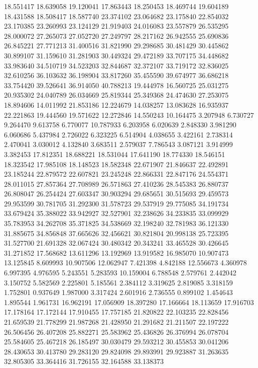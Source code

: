 18.551417
18.639058
19.120041
17.863443
18.250453
18.469744
19.604189
18.431588
18.508417
18.587740
23.374102
23.064682
23.175840
22.854032
23.170385
23.260993
23.124129
21.919403
24.016083
23.557879
26.535295
28.000072
27.265073
27.052720
27.249797
28.217162
26.942555
25.690836
26.845221
27.771213
31.400516
31.821990
29.298685
30.481429
30.445862
30.899107
31.159610
31.281903
30.449324
29.472189
33.707175
34.448682
33.983640
34.510719
34.523203
32.844687
32.372107
33.719172
32.836025
32.610256
36.103632
36.198904
33.817260
35.455590
39.674977
36.686218
33.754420
39.526641
36.914050
40.788213
19.444978
16.560725
25.031275
20.935302
24.040789
26.034669
25.819344
25.349368
24.474630
27.253075
18.894606
14.011992
21.853186
12.224679
14.038257
13.083628
16.935937
22.221863
19.444560
19.571622
12.272846
14.550243
10.164475
3.207948
6.730727
9.264470
9.613758
6.770077
10.787933
6.203958
6.020639
2.848330
3.981290
6.060686
5.437984
2.726022
6.323225
6.514904
4.038655
3.422161
2.738314
2.470041
3.030012
4.132840
3.683511
2.579037
7.786543
3.087121
3.914999
3.382453
17.812351
18.688221
18.531044
17.641190
18.774330
18.546151
18.323542
17.985108
18.148523
18.582348
22.671907
21.846637
22.492891
23.185244
22.879572
22.607821
23.245248
22.866331
22.847176
24.554371
28.011015
27.857364
27.708989
26.571863
27.410236
28.545383
26.880737
26.808047
26.254424
27.603347
30.903294
29.685651
30.515693
29.459573
29.953599
30.781705
31.292300
31.578723
29.537919
29.775085
34.191734
33.679424
35.388022
33.942927
32.527901
32.238626
34.233835
33.099929
35.783953
34.262708
35.371825
34.538669
32.198240
32.781983
36.121330
31.885675
34.856848
37.665626
32.456621
30.821804
20.998138
25.723395
31.527700
21.691328
32.067424
30.480342
20.343241
33.465528
30.426645
31.271852
17.568682
13.611296
13.192969
13.919582
16.985070
10.907473
13.125845
8.609993
10.907506
12.062947
7.421398
4.842188
12.556673
4.360978
6.997395
4.976595
5.243551
5.283593
10.159004
6.788548
2.579761
2.442042
3.150752
5.582569
2.225801
5.185561
2.384112
3.319625
2.819085
3.318159
1.752801
0.937649
1.987000
3.317424
2.601916
2.736555
0.899102
1.454643
1.895544
1.961731
16.962191
17.056909
18.397280
17.166664
18.113659
17.916703
17.178164
17.172144
17.910455
17.757185
21.820822
22.103235
22.828456
21.659539
21.778299
21.987268
21.428950
21.291682
21.211507
22.197222
26.506456
26.407208
25.882271
25.583962
25.436826
26.376994
26.078704
25.584605
25.467218
26.185497
30.030479
29.593212
30.455853
30.041206
28.430653
30.413780
29.283120
29.824098
29.893991
29.923887
31.263635
32.805305
33.364416
31.726155
32.164588
33.138373
